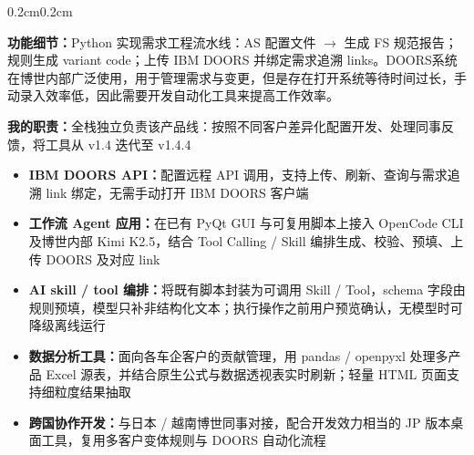 \documentclass[10pt, a4paper]{article}
\newenvironment{highlights}{
    \begin{itemize}[
        topsep=0.10cm, parsep=0.10cm,
        partopsep=0pt, itemsep=0pt,
        leftmargin=0.4cm + 10pt
    ]
}{
    \end{itemize}
}
\newenvironment{onecolentry}{
    \begin{adjustwidth}{0.2cm}{0.2cm}
}{
    \end{adjustwidth}
}
\begin{document}
    \vspace{-0.18cm}

    \begin{onecolentry}

        \textbf{功能细节：}Python 实现需求工程流水线：AS 配置文件 $\to$ 生成 FS 规范报告；规则生成 variant code；上传 IBM DOORS 并绑定需求追溯 links。DOORS系统在博世内部广泛使用，用于管理需求与变更，但是存在打开系统等待时间过长，手动录入效率低，因此需要开发自动化工具来提高工作效率。\newline
        \vspace{-0.85em}

        \textbf{我的职责：}全栈独立负责该产品线：按照不同客户差异化配置开发、处理同事反馈，将工具从 v1.4 迭代至 v1.4.4\newline
        \vspace{-0.85em}

        \begin{highlights}
            \item \textbf{IBM DOORS API：}配置远程 API 调用，支持上传、刷新、查询与需求追溯 link 绑定，无需手动打开 IBM DOORS 客户端
            \item \textbf{工作流 Agent 应用：}在已有 PyQt GUI 与可复用脚本上接入 OpenCode CLI 及博世内部 Kimi K2.5，结合 Tool Calling / Skill 编排生成、校验、预填、上传 DOORS 及对应 link
            \item \textbf{AI skill / tool 编排：}将既有脚本封装为可调用 Skill / Tool，schema 字段由规则预填，模型只补非结构化文本；执行操作之前用户预览确认，无模型时可降级离线运行
            \item \textbf{数据分析工具：}面向各车企客户的贡献管理，用 pandas / openpyxl 处理多产品 Excel 源表，并结合原生公式与数据透视表实时刷新；轻量 HTML 页面支持细粒度结果抽取
            \item \textbf{跨国协作开发：}与日本 / 越南博世同事对接，配合开发效力相当的 JP 版本桌面工具，复用多客户变体规则与 DOORS 自动化流程
        \end{highlights}
    \end{onecolentry}

    \vspace{0.14cm}
\end{document}
